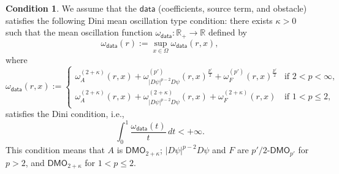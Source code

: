 \documentclass[reqno]{amsart}
\numberwithin{equation}{section}
\theoremstyle{plain}
\theoremstyle{definition}
\newtheorem{condition}[theorem]{Condition}
\theoremstyle{remark}
\newcommand{\bR}{\mathbb{R}}
\begin{document}
\begin{condition} \label{datacondi}
We assume that the $\mathsf{data}$ (coefficients, source term, and obstacle) satisfies the following Dini mean oscillation type condition: there exists $\kappa>0$ such that the mean oscillation function 
$\omega_{\mathsf{data}}:\bR_+\rightarrow\bR$ defined by
\[
\omega_{\mathsf{data}}(r):= \sup_{x\in \Omega} \omega_{\mathsf{data}}(r, x),
\]
where 
\begin{equation*}%
\omega_{\mathsf{data}}(r,x):=
\begin{cases}
 \omega^{(2+\kappa)}_A(r,x )+\omega_{|D\psi|^{p-2}D\psi}^{(p')}(r,x)^{\frac{p'}{2}}+ \omega_F^{(p')}(r,x)^{\frac{p'}{2}}  &\text{if } 2< p <\infty,\\[1ex]
\omega^{(2+\kappa)}_A(r,x )+ \omega^{(2+\kappa)}_{|D\psi|^{p-2}D\psi}(r,x )+\omega^{(2+\kappa)}_F (r,x ) &\text{if } 1< p \le 2,
\end{cases}
\end{equation*}
satisfies the Dini condition, i.e.,
\begin{equation*}           
\int_0^1 \frac{\omega_{\mathsf{data}}(t)}{t} \,dt <+\infty.
\end{equation*} 
This condition means that $A$ is $\mathsf{DMO}_{2+\kappa}$; $|D\psi|^{p-2}D\psi$ and $F$ are $p'/2$-$\mathsf{DMO}_{p'}$ for $p > 2$, and $\mathsf{DMO}_{2+\kappa}$ for $1 < p \le 2$. 
\end{condition}
\end{document}
